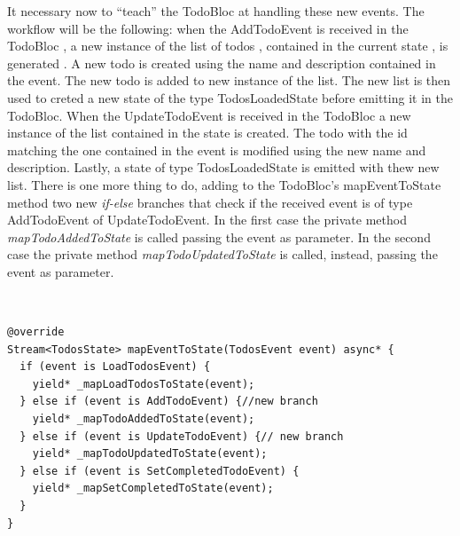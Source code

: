 It necessary now to “teach” the TodoBloc at handling these new events. The workflow will be the following: when the AddTodoEvent is received in the TodoBloc , a new instance of the list of todos , contained in the current state , is generated . A new todo is created using the name and description contained in the event. The new todo is added to new instance of the list. The new list is then used to creted a new state of the type TodosLoadedState before emitting it in the TodoBloc. When the UpdateTodoEvent is received in the TodoBloc a new instance of the list contained in the state is created. The todo with the id matching the one contained in the event is modified using the new name and description. Lastly, a state of type TodosLoadedState is emitted with thew new list. There is one more thing to do, adding to the TodoBloc’s mapEventToState method two new \textit{if-else} branches that check if the received event is of type AddTodoEvent of UpdateTodoEvent. In the first case the private method  \textit{mapTodoAddedToState} is called passing the event as parameter. In the second case the private method \textit{mapTodoUpdatedToState} is called, instead, passing the event as parameter.
\begin{code}
\mbox{}\\
 \mbox{}
\label{code:2.14}
\begin{verbatim}
@override
Stream<TodosState> mapEventToState(TodosEvent event) async* {
  if (event is LoadTodosEvent) {
    yield* _mapLoadTodosToState(event);
  } else if (event is AddTodoEvent) {//new branch
    yield* _mapTodoAddedToState(event);
  } else if (event is UpdateTodoEvent) {// new branch
    yield* _mapTodoUpdatedToState(event);
  } else if (event is SetCompletedTodoEvent) {
    yield* _mapSetCompletedToState(event);
  } 
}
\end{verbatim}
\mbox{}
\end{code}

